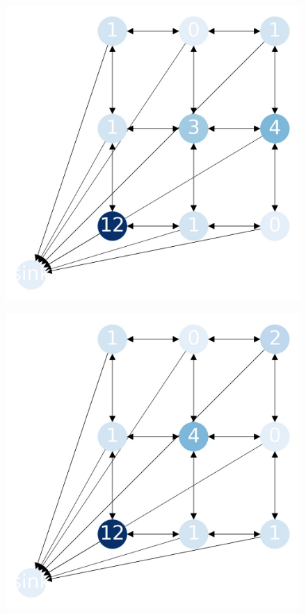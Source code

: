 \documentclass{beamer}
\begin{document}
    \begin{frame}
      \begin{figure}[h!]
        \centering
          \includegraphics[scale=0.25]{sandpile_-26}
      \end{figure}
    \end{frame}
    

    \begin{frame}
      \begin{figure}[h!]
        \centering
          \includegraphics[scale=0.25]{sandpile_-27}
      \end{figure}
    \end{frame}
    
\end{document}
